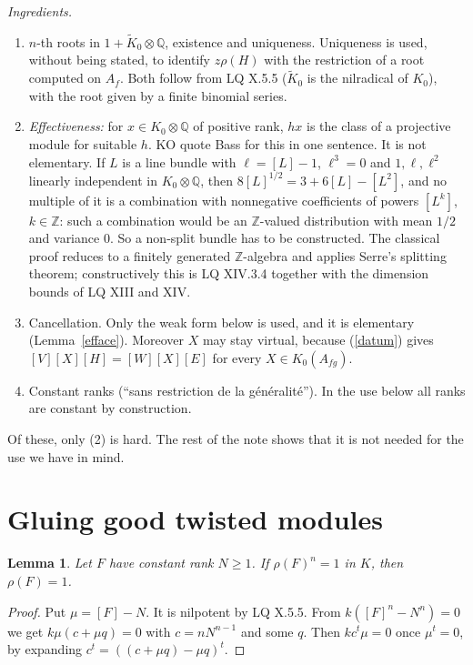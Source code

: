 \documentclass[11pt]{amsart}
\newtheorem{lemma}[theorem]{Lemma}
\theoremstyle{definition}
\theoremstyle{remark}
\newcommand{\Q}{\mathbb Q}
\newcommand{\Kt}{\widetilde K_0}
\begin{document}
\smallskip\noindent\emph{Ingredients.}
\begin{enumerate}
\item $n$-th roots in $1+\Kt\otimes\Q$, existence and uniqueness. Uniqueness
  is used, without being stated, to identify $z\rho(H)$ with the restriction
  of a root computed on $A_f$. Both follow from LQ X.5.5 ($\Kt$ is the
  nilradical of $K_0$), with the root given by a finite binomial series.
\item \emph{Effectiveness:} for $x\in K_0\otimes\Q$ of positive rank, $hx$ is
  the class of a projective module for suitable $h$. KO quote Bass for this
  in one sentence. It is not elementary. If $L$ is a line bundle with
  $\ell=[L]-1$, $\ell^3=0$ and $1,\ell,\ell^2$ linearly independent in
  $K_0\otimes\Q$, then $8[L]^{1/2}=3+6[L]-[L^2]$,
  and no multiple of it is a combination with nonnegative coefficients of
  powers $[L^k]$, $k\in\mathbb Z$: such a combination would be an
  $\mathbb Z$-valued distribution with mean $1/2$ and variance $0$. So a
  non-split bundle has to be constructed. The classical proof reduces to a
  finitely generated $\mathbb Z$-algebra and applies Serre's splitting
  theorem; constructively this is LQ XIV.3.4 together with the
  dimension bounds of LQ XIII and XIV.
\item Cancellation. Only the weak form below is used, and it is elementary
  (Lemma~\ref{efface}). Moreover $X$ may stay virtual, because
  (\ref{datum}) gives $[V][X][H]=[W][X][E]$ for every $X\in K_0(A_{fg})$.
\item Constant ranks (``sans restriction de la g\'en\'eralit\'e''). In the use
  below all ranks are constant by construction.
\end{enumerate}
Of these, only (2) is hard. The rest of the note shows that it is not needed
for the use we have in mind.

\section{Gluing good twisted modules}

\begin{lemma}\label{roots}
Let $F$ have constant rank $N\geq1$. If $\rho(F)^n=1$ in $K$, then
$\rho(F)=1$.
\end{lemma}
\begin{proof}
Put $\mu=[F]-N$. It is nilpotent by LQ X.5.5. From
$k([F]^n-N^n)=0$ we get $k\mu(c+\mu q)=0$ with $c=nN^{n-1}$ and some $q$.
Then $kc^t\mu=0$ once $\mu^t=0$, by expanding $c^t=((c+\mu q)-\mu q)^t$.
\end{proof}
\end{document}
